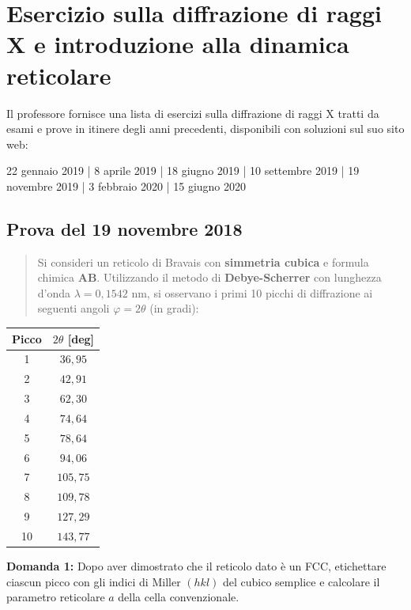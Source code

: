 \chapter{Esercizio sulla diffrazione di raggi X e introduzione alla dinamica reticolare}



Il professore fornisce una lista di esercizi sulla diffrazione di raggi X tratti da esami e prove in itinere degli anni precedenti, disponibili con soluzioni sul suo sito web:

22 gennaio 2019 | 8 aprile 2019 | 18 giugno 2019 | 10 settembre 2019 | 19 novembre 2019 | 3 febbraio 2020 | 15 giugno 2020



\section{Prova del 19 novembre 2018}

\begin{quote}
Si consideri un reticolo di Bravais con \textbf{simmetria cubica} e formula chimica \textbf{AB}. Utilizzando il metodo di \textbf{Debye-Scherrer} con lunghezza d'onda $\lambda = 0{,}1542$ nm, si osservano i primi 10 picchi di diffrazione ai seguenti angoli $\varphi = 2\theta$ (in gradi):
\end{quote}

\begin{table}[h!]
\centering
\begin{tabular}{|c|c|}
\hline
Picco & $2\theta$ [deg] \\ \hline
1 & $36{,}95$ \\
2 & $42{,}91$ \\
3 & $62{,}30$ \\
4 & $74{,}64$ \\
5 & $78{,}64$ \\
6 & $94{,}06$ \\
7 & $105{,}75$ \\
8 & $109{,}78$ \\
9 & $127{,}29$ \\
10 & $143{,}77$ \\ \hline
\end{tabular}
\end{table}

\textbf{Domanda 1:} Dopo aver dimostrato che il reticolo dato è un FCC, etichettare ciascun picco con gli indici di Miller $(hkl)$ del cubico semplice e calcolare il parametro reticolare $a$ della cella convenzionale.

